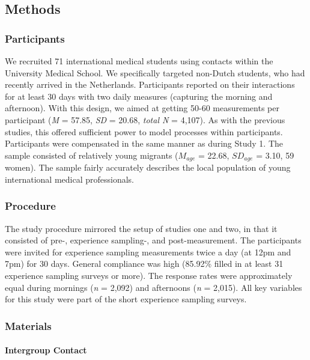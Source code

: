 \documentclass[man, 12pt, a4paper, mask]{apa7}
\theoremstyle{break}
\theoremstyle{plain}
\begin{document}
\subsection{Methods}

\subsubsection{Participants}

We recruited 71 international medical students using contacts within the
University Medical School. We specifically targeted non-Dutch students,
who had recently arrived in the Netherlands. Participants reported on
their interactions for at least 30 days with two daily measures
(capturing the morning and afternoon). With this design, we aimed at
getting 50-60 measurements per participant (\textit{M} = 57.85,
\textit{SD} = 20.68, \textit{total N} = 4,107). As with the previous
studies, this offered sufficient power to model processes within
participants. Participants were compensated in the same manner as during
Study 1. The sample consisted of relatively young migrants (\(M_{age}\)
= 22.68, \(SD_{age}\) = 3.10, 59 women). The sample fairly accurately
describes the local population of young international medical
professionals.

\subsubsection{Procedure}

The study procedure mirrored the setup of studies one and two, in that
it consisted of pre-, experience sampling-, and post-measurement. The
participants were invited for experience sampling measurements twice a
day (at 12pm and 7pm) for 30 days. General compliance was high (85.92\%
filled in at least 31 experience sampling surveys or more). The response
rates were approximately equal during mornings (\textit{n} = 2,092) and
afternoons (\textit{n} = 2,015). All key variables for this study were
part of the short experience sampling surveys.

\subsubsection{Materials}

\paragraph{Intergroup Contact}
\end{document}
